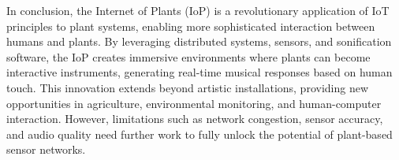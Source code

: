 In conclusion, the Internet of Plants (IoP) is a revolutionary application of IoT principles to plant systems, enabling more sophisticated interaction between humans and plants. By leveraging distributed systems, sensors, and sonification software, the IoP creates immersive environments where plants can become interactive instruments, generating real-time musical responses based on human touch. This innovation extends beyond artistic installations, providing new opportunities in agriculture, environmental monitoring, and human-computer interaction. However, limitations such as network congestion, sensor accuracy, and audio quality need further work to fully unlock the potential of plant-based sensor networks.

